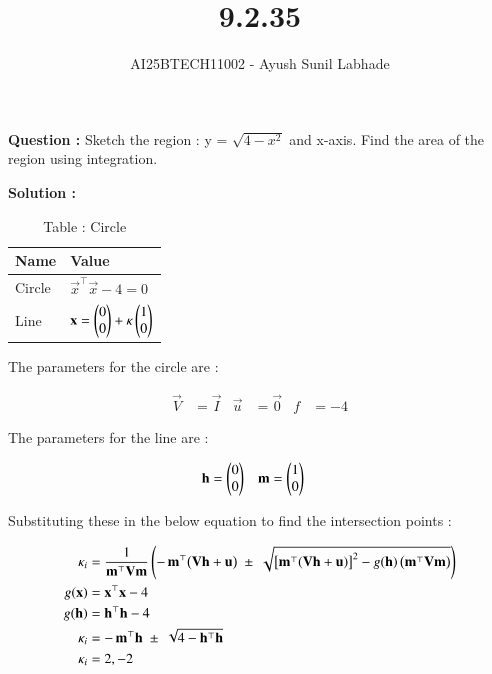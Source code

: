 \documentclass[journal,12pt,onecolumn]{IEEEtran}
\begin{document}
\title{9.2.35}
\author{AI25BTECH11002 - Ayush Sunil Labhade}
\maketitle

\textbf{Question :} Sketch the region  : y = $\sqrt{4 - x^2}$ and x-axis. Find the area of the region using integration.

\textbf{Solution :}

\begin{table}[h!]
  \centering
  \begin{tabular}{|l|l|}
  \hline
  Name & Value \\
  \hline
  Circle & $\vec{x}^\top\vec{x} - 4 = 0$ \\
  Line & $\mathbf{x} = \begin{pmatrix}0\\0\end{pmatrix} + \kappa \begin{pmatrix}1\\0\end{pmatrix}$ \\
  \hline
  \end{tabular}
  \caption*{Table : Circle}
  \label{9.2.35}
\end{table}

The parameters for the circle are :

\begin{align}
  \vec{V} &= \vec{I} & \vec{u} &= \vec{0} & f &= -4 
\end{align}

The parameters for the line are :

\begin{align}
  \mathbf{h} &= \begin{pmatrix}0\\0\end{pmatrix} & \mathbf{m} &= \begin{pmatrix}1\\0\end{pmatrix}
\end{align}

Substituting these in the below equation to find the intersection points :

\begin{align}
\kappa_i
	&= \frac{1}{\mathbf{m}^\top \mathbf{V}\mathbf{m}} \left(
       -\,\mathbf{m}^\top\big(\mathbf{V}\mathbf{h}+\mathbf{u}\big)
       \;\pm\;
       \sqrt{ \big[\mathbf{m}^\top(\mathbf{V}\mathbf{h}+\mathbf{u})\big]^2
	- g(\mathbf{h})\,\big(\mathbf{m}^\top \mathbf{V}\mathbf{m}\big)}\right)\\
    g(\mathbf{x}) &= \mathbf{x}^\top\mathbf{x} - 4 \\
    g(\mathbf{h}) &= \mathbf{h}^\top\mathbf{h} - 4 \\
\kappa_i &= 
       -\,\mathbf{m}^\top\mathbf{h}
       \;\pm\;
       \sqrt{4 -\mathbf{h}^\top\mathbf{h}} \\
  \kappa_i &= 2,-2
\end{align}
\end{document}
